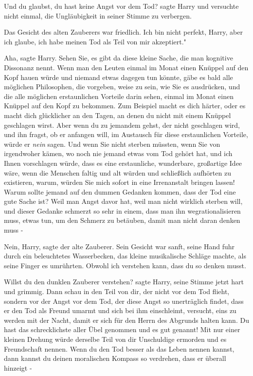 \glqq{}Und du glaubst, du hast keine Angst vor dem Tod?\grqq{} sagte Harry und
versuchte nicht einmal, die Ungläubigkeit in seiner Stimme zu verbergen.

Das Gesicht des alten Zauberers war friedlich. \glqq{}Ich bin nicht perfekt,
Harry, aber ich glaube, ich habe meinen Tod als Teil von mir akzeptiert."

\glqq{}Aha\grqq{}, sagte Harry. \glqq{}Sehen Sie, es gibt da diese kleine Sache,
die man kognitive Dissonanz nennt. Wenn man den Leuten einmal im Monat einen
Knüppel auf den Kopf hauen würde und niemand etwas dagegen tun könnte, gäbe es
bald alle möglichen Philosophen, die vorgeben, weise zu sein, wie Sie es
ausdrücken, und die alle möglichen erstaunlichen Vorteile darin sehen, einmal im
Monat einen Knüppel auf den Kopf zu bekommen. Zum Beispiel macht es dich härter,
oder es macht dich glücklicher an den Tagen, an denen du nicht mit einem Knüppel
geschlagen wirst. Aber wenn du zu jemandem gehst, der nicht geschlagen wird, und
ihn fragst, ob er anfangen will, im Austausch für diese erstaunlichen Vorteile,
würde er \emph{nein} sagen. Und wenn Sie nicht sterben müssten, wenn Sie von
irgendwoher kämen, wo noch nie jemand etwas vom Tod gehört hat, und ich Ihnen
vorschlagen würde, dass es eine erstaunliche, wunderbare, großartige Idee wäre,
wenn die Menschen faltig und alt würden und schließlich aufhörten zu existieren,
warum, würden Sie mich sofort in eine Irrenanstalt bringen lassen! Warum sollte
jemand auf den dummen Gedanken kommen, dass der Tod eine gute Sache ist? Weil
man Angst davor hat, weil man nicht wirklich sterben will, und dieser Gedanke
schmerzt so sehr in einem, dass man ihn wegrationalisieren muss, etwas tun, um
den Schmerz zu betäuben, damit man nicht daran denken muss -\grqq{}

\glqq{}Nein, Harry\grqq{}, sagte der alte Zauberer. Sein Gesicht war sanft, seine
Hand fuhr durch ein beleuchtetes Wasserbecken, das kleine musikalische Schläge
machte, als seine Finger es umrührten. \glqq{}Obwohl ich verstehen kann, dass du
so denken musst.\grqq{}

\glqq{}Willst du den dunklen Zauberer verstehen?\grqq{} sagte Harry, seine Stimme
jetzt hart und grimmig. \glqq{}Dann schau in den Teil von dir, der nicht vor dem
Tod flieht, sondern vor der Angst vor dem Tod, der diese Angst so unerträglich
findet, dass er den Tod als Freund umarmt und sich bei ihm einschleimt,
versucht, eins zu werden mit der Nacht, damit er sich für den Herrn des Abgrunds
halten kann. Du hast das schrecklichste aller Übel genommen und es gut genannt!
Mit nur einer kleinen Drehung würde derselbe Teil von dir Unschuldige ermorden
und es Freundschaft nennen. Wenn du den Tod besser als das Leben nennen kannst,
dann kannst du deinen moralischen Kompass so verdrehen, dass er überall hinzeigt
-\grqq{}

